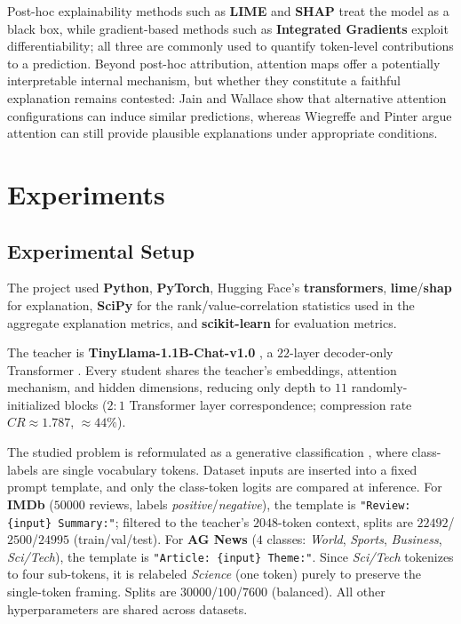 \documentclass[conference]{IEEEtran}
\begin{document}
Post-hoc explainability methods such as \textbf{LIME} \cite{ribeiro2016should} and \textbf{SHAP} \cite{lundberg2017unified} treat the model as a black box, while gradient-based methods such as \textbf{Integrated Gradients} \cite{sundararajan2017axiomatic} exploit differentiability; all three are commonly used to quantify token-level contributions to a prediction. Beyond post-hoc attribution, attention maps offer a potentially interpretable internal mechanism, but whether they constitute a faithful explanation remains contested: Jain and Wallace \cite{jain2019attention} show that alternative attention configurations can induce similar predictions, whereas Wiegreffe and Pinter \cite{wiegreffe2019attention} argue attention can still provide plausible explanations under appropriate conditions.

\section{Experiments}

\subsection{Experimental Setup}\label{sec:setup}

The project used \textbf{Python}, \textbf{PyTorch}, Hugging Face's \textbf{transformers}, \textbf{lime}/\textbf{shap} for explanation, \textbf{SciPy} for the rank/value-correlation statistics used in the aggregate explanation metrics, and \textbf{scikit-learn} for evaluation metrics.

The teacher is \textbf{TinyLlama-1.1B-Chat-v1.0} \cite{zhang2024tinyllama}, a $22$-layer decoder-only Transformer \cite{vaswani2017attention}. Every student shares the teacher's embeddings, attention mechanism, and hidden dimensions, reducing only depth to $11$ randomly-initialized blocks ($2{:}1$ Transformer layer correspondence; compression rate $CR\approx1.787$, $\approx44\%$).

The studied problem is reformulated as a generative classification \cite{schick2021exploiting}, where class-labels are single vocabulary tokens. Dataset inputs are inserted into a fixed prompt template, and only the class-token logits are compared at inference. For \textbf{IMDb} \cite{maas2011learning} ($50000$ reviews, labels \textit{positive}/\textit{negative}), the template is \texttt{"Review: \{input\} Summary:"}; filtered to the teacher's $2048$-token context, splits are $22492$/$2500$/$24995$ (train/val/test). For \textbf{AG News} \cite{zhang2015character} ($4$ classes: \textit{World}, \textit{Sports}, \textit{Business}, \textit{Sci/Tech}), the template is \texttt{"Article: \{input\} Theme:"}. Since \textit{Sci/Tech} tokenizes to four sub-tokens, it is relabeled \textit{Science} (one token) purely to preserve the single-token framing. Splits are $30000$/$100$/$7600$ (balanced). All other hyperparameters are shared across datasets.
\end{document}

